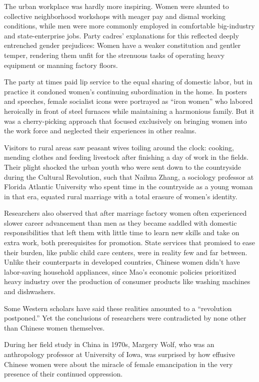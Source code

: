 The urban workplace was hardly more inspiring. Women were shunted to
collective neighborhood workshops with meager pay and dismal working
conditions, while men were more commonly employed in comfortable
big-industry and state-enterprise jobs. Party cadres' explanations for
this reflected deeply entrenched gender prejudices: Women have a weaker
constitution and gentler temper, rendering them unfit for the strenuous
tasks of operating heavy equipment or manning factory floors.

The party at times paid lip service to the equal sharing of domestic
labor, but in practice it condoned women's continuing subordination in
the home. In posters and speeches, female socialist icons were portrayed
as ``iron women'' who labored heroically in front of steel furnaces
while maintaining a harmonious family. But it was a cherry-picking
approach that focused exclusively on bringing women into the work force
and neglected their experiences in other realms.

Visitors to rural areas saw peasant wives toiling around the clock:
cooking, mending clothes and feeding livestock after finishing a day of
work in the fields. Their plight shocked the urban youth who were sent
down to the countryside during the Cultural Revolution, such that Naihua
Zhang, a sociology professor at Florida Atlantic University who spent
time in the countryside as a young woman in that era, equated rural
marriage with a total erasure of women's identity.

Researchers also observed that after marriage factory women often
experienced slower career advancement than men as they became saddled
with domestic responsibilities that left them with little time to learn
new skills and take on extra work, both prerequisites for promotion.
State services that promised to ease their burden, like public child
care centers, were in reality few and far between. Unlike their
counterparts in developed countries, Chinese women didn't have
labor-saving household appliances, since Mao's economic policies
prioritized heavy industry over the production of consumer products like
washing machines and dishwashers.

Some Western scholars have said these realities amounted to a
``revolution postponed.'' Yet the conclusions of researchers were
contradicted by none other than Chinese women themselves.

During her field study in China in 1970s, Margery Wolf, who was an
anthropology professor at University of Iowa, was surprised by how
effusive Chinese women were about the miracle of female emancipation in
the very presence of their continued oppression.


